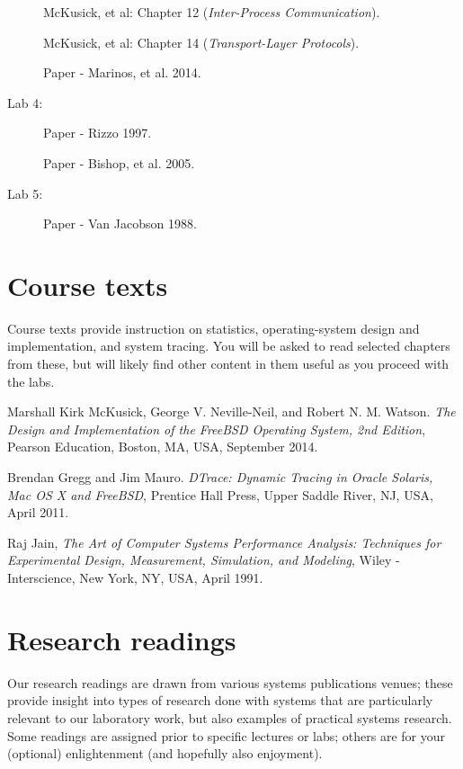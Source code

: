 \documentclass[a4paper,10pt]{article}
\begin{document}
\begin{description}
  McKusick, et al: Chapter 12 (\textit{Inter-Process Communication}).


  McKusick, et al: Chapter 14 (\textit{Transport-Layer Protocols}).

  Paper - Marinos, et al. 2014.

\item[Lab 4:]

  Paper - Rizzo 1997.

  Paper - Bishop, et al. 2005.

\item[Lab 5:]

  Paper - Van Jacobson 1988.
\end{description}

\section*{Course texts}
Course texts provide instruction on statistics, operating-system design and
implementation, and system tracing.
You will be asked to read selected chapters from these, but will likely find
other content in them useful as you proceed with the labs.

\medskip

\noindent
Marshall Kirk McKusick, George V. Neville-Neil, and Robert N. M. Watson.
\textit{The Design and Implementation of the FreeBSD Operating System, 2nd
Edition}, Pearson Education, Boston, MA, USA, September 2014.


\medskip
\noindent
Brendan Gregg and Jim Mauro. \textit{DTrace: Dynamic Tracing in Oracle
Solaris, Mac OS X and FreeBSD}, Prentice Hall Press, Upper Saddle River, NJ,
USA, April 2011.

\medskip
\noindent
Raj Jain, \textit{The Art of Computer Systems Performance Analysis: Techniques
for Experimental Design, Measurement, Simulation, and Modeling}, Wiley -
Interscience, New York, NY, USA, April 1991.

\section*{Research readings}

Our research readings are drawn from various systems publications venues;
these provide insight into types of research done with systems that are
particularly relevant to our laboratory work, but also examples of practical
systems research.
Some readings are assigned prior to specific lectures or labs; others are for
your (optional) enlightenment (and hopefully also enjoyment).
\end{document}
